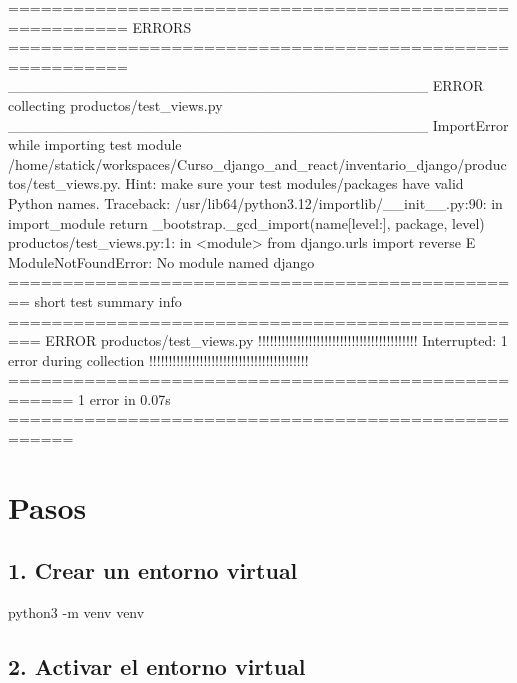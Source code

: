 \documentclass[
  a4paper,
  DIV=11,
  numbers=noendperiod,
  onepage,
  openany]{scrreprt}
\newenvironment{Shaded}{\begin{snugshade}}{\end{snugshade}}
\newcommand{\NormalTok}[1]{\textcolor[rgb]{0.00,0.23,0.31}{#1}}
\begin{document}
\begin{tcolorbox}
\begin{Shaded}
\begin{Highlighting}[]
\NormalTok{========================================================= ERRORS =========================================================}
\NormalTok{\_\_\_\_\_\_\_\_\_\_\_\_\_\_\_\_\_\_\_\_\_\_\_\_\_\_\_\_\_\_\_\_\_\_\_\_\_\_\_\_ ERROR collecting productos/test\_views.py \_\_\_\_\_\_\_\_\_\_\_\_\_\_\_\_\_\_\_\_\_\_\_\_\_\_\_\_\_\_\_\_\_\_\_\_\_\_\_\_}
\NormalTok{ImportError while importing test module \textquotesingle{}/home/statick/workspaces/Curso\_django\_and\_react/inventario\_django/productos/test\_views.py\textquotesingle{}.}
\NormalTok{Hint: make sure your test modules/packages have valid Python names.}
\NormalTok{Traceback:}
\NormalTok{/usr/lib64/python3.12/importlib/\_\_init\_\_.py:90: in import\_module}
\NormalTok{    return \_bootstrap.\_gcd\_import(name[level:], package, level)}
\NormalTok{productos/test\_views.py:1: in \textless{}module\textgreater{}}
\NormalTok{    from django.urls import reverse}
\NormalTok{E   ModuleNotFoundError: No module named \textquotesingle{}django\textquotesingle{}}
\NormalTok{================================================ short test summary info =================================================}
\NormalTok{ERROR productos/test\_views.py}
\NormalTok{!!!!!!!!!!!!!!!!!!!!!!!!!!!!!!!!!!!!!!!!! Interrupted: 1 error during collection !!!!!!!!!!!!!!!!!!!!!!!!!!!!!!!!!!!!!!!!!}
\NormalTok{==================================================== 1 error in 0.07s ====================================================}
\end{Highlighting}
\end{Shaded}

\section{Pasos}\label{pasos}

\subsection{1. Crear un entorno
virtual}\label{crear-un-entorno-virtual-2}

\begin{Shaded}
\begin{Highlighting}[]
\NormalTok{python3 {-}m venv venv}
\end{Highlighting}
\end{Shaded}

\subsection{2. Activar el entorno
virtual}\label{activar-el-entorno-virtual-1}


\end{tcolorbox}
\end{document}
